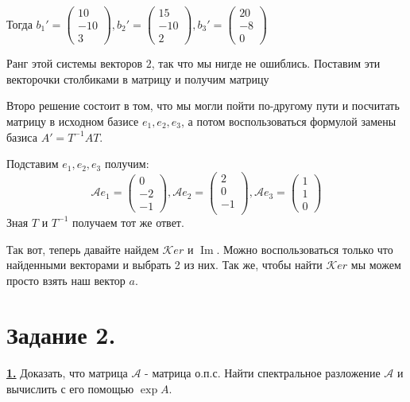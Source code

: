 \documentclass{article}
\makeatletter
\newcommand{\deff}[1]{\underline{\textbf{#1}}}
\DeclareMathOperator{\@custom@Im}{Im}
\renewcommand{\Im}{\@custom@Im}
\renewcommand{\ker}{\mathcal{K}er}
\makeatother
\begin{document}
Тогда $b_1' =\begin{pmatrix}
    10 \\
    -10 \\
    3
\end{pmatrix}, b_2' = \begin{pmatrix}
    15 \\
    -10\\
    2
\end{pmatrix}, b_3' =\begin{pmatrix}
    20 \\
    -8\\
    0
\end{pmatrix}$

Ранг этой системы векторов $2$, так что мы нигде не ошиблись. Поставим эти векторочки столбиками в матрицу и получим матрицу 

Второ решение состоит в том, что мы могли пойти по-другому пути и посчитать матрицу в исходном базисе $e_1,e_2,e_3$, а потом воспользоваться формулой замены базиса $A' =T^{-1}AT$.

Подставим $e_1,e_2,e_3$ получим:
$$\mathcal{A}e_1 = \begin{pmatrix}
    0\\
    -2\\
    -1
\end{pmatrix}, \mathcal{A}e_2 = \begin{pmatrix}
    2 \\
    0 \\
    -1 \\
\end{pmatrix}, \mathcal{A}e_3 =  \begin{pmatrix}
    1 \\
    1 \\
    0
\end{pmatrix}$$
Зная $T$ и $T^{-1}$ получаем тот же ответ.

Так вот, теперь давайте найдем $\ker$ и $\Im$. Можно воспользоваться только что найденными векторами и выбрать 2 из них. Так же, чтобы найти $\ker$ мы можем просто взять наш вектор $a$.

\newpage
\section{Задание 2.}

\deff{1.} Доказать, что матрица $\mathcal{A}$ - матрица о.п.с. Найти спектральное разложение $\mathcal{A}$ и вычислить с его помощью $\exp A$.
\end{document}
